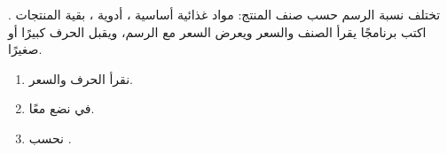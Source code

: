 \begin{statement}
تختلف نسبة الرسم حسب صنف المنتج:  مواد غذائية أساسية ،  أدوية ،  بقية المنتجات . اكتب برنامجًا يقرأ الصنف والسعر ويعرض السعر مع الرسم، ويقبل الحرف كبيرًا أو صغيرًا.
\end{statement}
\begin{stepsbox}\begin{enumerate}
\item نقرأ الحرف  والسعر.
\item في  نضع  معًا.
\item نحسب .
\end{enumerate}\end{stepsbox}
